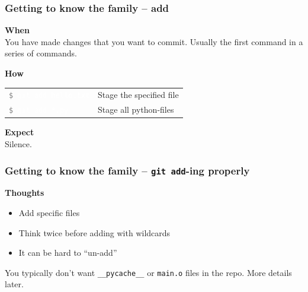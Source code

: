 \documentclass{beamer}
\newcommand{\keyword}[1]{\hspace{-1.0em}\textcolor{lkblue}{\textbf{#1}}\vspace{0.2em}} %
\newcommand{\command}[1]{\colorbox{black!78}{\vphantom{Ep}\texttt{\textcolor{gray}{\$}
\textcolor{white}{#1}}}}
\begin{document}
\begin{frame}
  \frametitle{Getting to know the family -- add}
  \keyword{When}\\
    You have made changes that you want to commit.
    Usually the first command in a series of commands.
  \vspace{0.5em}

  \keyword{How}\\
  \hspace{-0.95em}
  \begin{tabular}{ll}
    \command{git add hello.txt} & Stage the specified file \\
    \command{git add *.py} & Stage all python-files \\
  \end{tabular}
  \vspace{0.5em}

  \keyword{Expect}\\
  Silence.
\end{frame}

\begin{frame}
  \frametitle{Getting to know the family -- \texttt{git add}-ing properly}

  \keyword{Thoughts}
  \begin{itemize}[<+->]
    \item Add specific files
    \item Think twice before adding with wildcards
    \item It can be hard to ``un-add''
  \end{itemize}

  \vspace{1em}

  You typically don't want \texttt{\_\_pycache\_\_} or \texttt{main.o} files in
  the repo. More details later.

\end{frame}
\end{document}
